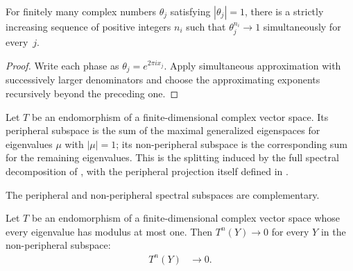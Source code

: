 \begin{corollary}
    \label{cor:dirichlet_phase_recurrence}
    \leanok
    For finitely many complex numbers $\theta_j$ satisfying $|\theta_j|=1$,
    there is a strictly increasing sequence of positive integers $n_i$ such
    that $\theta_j^{n_i}\longrightarrow1$ simultaneously for every~$j$.
\end{corollary}

\begin{proof}\leanok
    Write each phase as $\theta_j=e^{2\pi i x_j}$. Apply simultaneous
    approximation with successively larger denominators and choose the
    approximating exponents recursively beyond the preceding one.
\end{proof}

\begin{definition}
    \label{def:peripheral_spectral_splitting}
    \leanok
    Let $T$ be an endomorphism of a finite-dimensional complex vector space.
    Its peripheral subspace is the sum of the maximal generalized eigenspaces
    for eigenvalues $\mu$ with $|\mu|=1$; its non-peripheral subspace is the
    corresponding sum for the remaining eigenvalues. This is the splitting
    induced by the full spectral decomposition of
    \cite[Equation~(6.5)]{Wolf2012Quantum}, with the peripheral projection
    itself defined in \cite[Equation~(6.12)]{Wolf2012Quantum}.
\end{definition}

\begin{theorem}
    \label{thm:peripheral_spectral_complementarity}
    \leanok
    The peripheral and non-peripheral spectral subspaces are complementary.
\end{theorem}

\begin{lemma}
    \label{lem:non_peripheral_pow_vanishing}
    \leanok
    Let $T$ be an endomorphism of a finite-dimensional complex vector space
    whose every eigenvalue has modulus at most one. Then $T^{n}(Y)\to0$ for
    every $Y$ in the non-peripheral subspace:
    \begin{align}
        T^{n}(Y)&\longrightarrow0.
        \label{eq:non_peripheral_pow_vanishing}
    \end{align}
\end{lemma}


